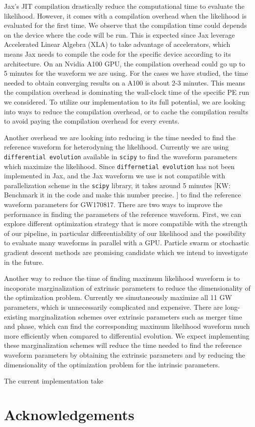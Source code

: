 \documentclass[twocolumn]{aastex631}
\newcommand{\kw}[1]{{\color{rb4}[KW: #1 ]}}
\begin{document}
Jax's JIT compilation drastically reduce the computational time to evaluate the
likelihood. However, it comes with a compilation overhead when the likelihood is
evaluated for the first time. We observe that the compilation time could depends
on the device where the code will be run. This is expected since Jax leverage
Accelerated Linear Algebra (XLA) to take advantage of accelerators, which means
Jax needs to compile the code for the specific device according to its
architecture. On an Nvidia A100 GPU, the compilation overhead could go up to 5
minutes for the waveform we are using. For the cases we have studied, the time
needed to obtain converging results on a A100 is about 2-3 minutes. This means
the compilation overhead is dominating the wall-clock time of the specific PE
run we considered. To utilize our implementation to its full potential, we are
looking into ways to reduce the compilation overhead, or to cache the
compilation results to avoid paying the compilation overhead for every events.


Another overhead we are looking into reducing is the time needed to find the
reference waveform for heterodyning the likelihood. Currently we are using
\texttt{differential evolution} available in \texttt{scipy} to find the waveform
parameters which maximize the likelihood. Since \texttt{differnetial evolution}
has not been implemented in Jax, and the Jax waveform we use is not compatible
with parallelization scheme in the \texttt{scipy} library, it takes around 5
minutes \kw{Benchmark it in the code and make this number precise.} to find the
reference waveform parameters for GW170817. There are two ways to improve the
performance in finding the parameters of the reference waveform. First, we can
explore different optimization strategy that is more compatible with the
strength of our pipeline, in particular differentiability of our likelihood and
the possibility to evaluate many waveforms in parallel with a GPU. Particle
swarm or stochastic gradient descent methods are promising candidate which we
intend to investigate in the future. 

Another way to reduce the time of finding maximum likelihood waveform is to
incoporate marginalization of extrinsic parameters to reduce the dimensionality
of the optimization problem. Currently we simutaneously maximize all 11 GW
parameters, which is unnecessarily complicated and expensive. There are
long-existing marginalization schemes over extrinsic parameters such as merger
time and phase, which can find the corresponding maximum likelihood waveform
much more efficiently when compared to differential evolution. We expect
implementing these marginalization schemes will reduce the time needed to find
the reference waveform parameters by obtaining the extrinsic parameters and by
reducing the dimensionality of the optimization problem for the intrinsic
parameters.



The current implementation take 

\section{Acknowledgements}


\end{document}

